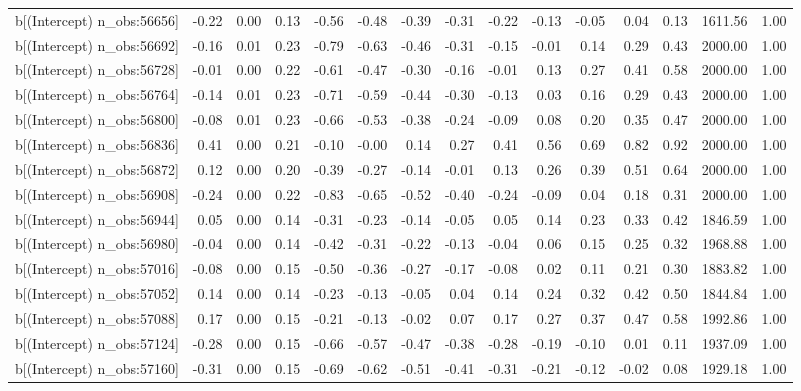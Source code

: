 \begin{table}[ht]
\begin{tabular}{rrrrrrrrrrrrrrr}
  b[(Intercept) n\_obs:56656] & -0.22 & 0.00 & 0.13 & -0.56 & -0.48 & -0.39 & -0.31 & -0.22 & -0.13 & -0.05 & 0.04 & 0.13 & 1611.56 & 1.00 \\ 
  b[(Intercept) n\_obs:56692] & -0.16 & 0.01 & 0.23 & -0.79 & -0.63 & -0.46 & -0.31 & -0.15 & -0.01 & 0.14 & 0.29 & 0.43 & 2000.00 & 1.00 \\ 
  b[(Intercept) n\_obs:56728] & -0.01 & 0.00 & 0.22 & -0.61 & -0.47 & -0.30 & -0.16 & -0.01 & 0.13 & 0.27 & 0.41 & 0.58 & 2000.00 & 1.00 \\ 
  b[(Intercept) n\_obs:56764] & -0.14 & 0.01 & 0.23 & -0.71 & -0.59 & -0.44 & -0.30 & -0.13 & 0.03 & 0.16 & 0.29 & 0.43 & 2000.00 & 1.00 \\ 
  b[(Intercept) n\_obs:56800] & -0.08 & 0.01 & 0.23 & -0.66 & -0.53 & -0.38 & -0.24 & -0.09 & 0.08 & 0.20 & 0.35 & 0.47 & 2000.00 & 1.00 \\ 
  b[(Intercept) n\_obs:56836] & 0.41 & 0.00 & 0.21 & -0.10 & -0.00 & 0.14 & 0.27 & 0.41 & 0.56 & 0.69 & 0.82 & 0.92 & 2000.00 & 1.00 \\ 
  b[(Intercept) n\_obs:56872] & 0.12 & 0.00 & 0.20 & -0.39 & -0.27 & -0.14 & -0.01 & 0.13 & 0.26 & 0.39 & 0.51 & 0.64 & 2000.00 & 1.00 \\ 
  b[(Intercept) n\_obs:56908] & -0.24 & 0.00 & 0.22 & -0.83 & -0.65 & -0.52 & -0.40 & -0.24 & -0.09 & 0.04 & 0.18 & 0.31 & 2000.00 & 1.00 \\ 
  b[(Intercept) n\_obs:56944] & 0.05 & 0.00 & 0.14 & -0.31 & -0.23 & -0.14 & -0.05 & 0.05 & 0.14 & 0.23 & 0.33 & 0.42 & 1846.59 & 1.00 \\ 
  b[(Intercept) n\_obs:56980] & -0.04 & 0.00 & 0.14 & -0.42 & -0.31 & -0.22 & -0.13 & -0.04 & 0.06 & 0.15 & 0.25 & 0.32 & 1968.88 & 1.00 \\ 
  b[(Intercept) n\_obs:57016] & -0.08 & 0.00 & 0.15 & -0.50 & -0.36 & -0.27 & -0.17 & -0.08 & 0.02 & 0.11 & 0.21 & 0.30 & 1883.82 & 1.00 \\ 
  b[(Intercept) n\_obs:57052] & 0.14 & 0.00 & 0.14 & -0.23 & -0.13 & -0.05 & 0.04 & 0.14 & 0.24 & 0.32 & 0.42 & 0.50 & 1844.84 & 1.00 \\ 
  b[(Intercept) n\_obs:57088] & 0.17 & 0.00 & 0.15 & -0.21 & -0.13 & -0.02 & 0.07 & 0.17 & 0.27 & 0.37 & 0.47 & 0.58 & 1992.86 & 1.00 \\ 
  b[(Intercept) n\_obs:57124] & -0.28 & 0.00 & 0.15 & -0.66 & -0.57 & -0.47 & -0.38 & -0.28 & -0.19 & -0.10 & 0.01 & 0.11 & 1937.09 & 1.00 \\ 
  b[(Intercept) n\_obs:57160] & -0.31 & 0.00 & 0.15 & -0.69 & -0.62 & -0.51 & -0.41 & -0.31 & -0.21 & -0.12 & -0.02 & 0.08 & 1929.18 & 1.00 \\ 

\end{tabular}
\end{table}
